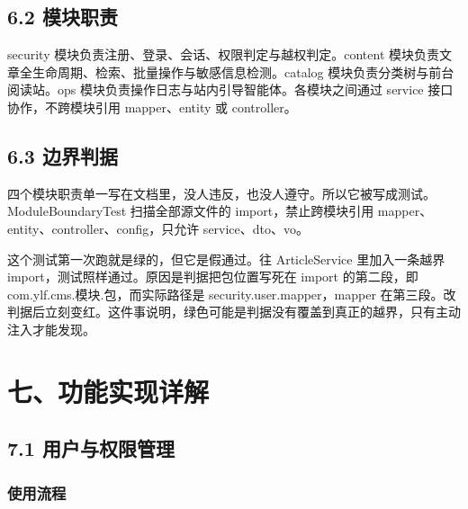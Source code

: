 \documentclass[zihao=-4,UTF8,openany]{ctexart}
\renewcommand{\_}{\textunderscore\allowbreak}
\begin{document}
\subsection*{\texorpdfstring{\textbf{6.2 模块职责}}{6.2 模块职责}}\label{ux6a21ux5757ux804cux8d23}

security 模块负责注册、登录、会话、权限判定与越权判定。content 模块负责文章全生命周期、检索、批量操作与敏感信息检测。catalog 模块负责分类树与前台阅读站。ops 模块负责操作日志与站内引导智能体。各模块之间通过 service 接口协作，不跨模块引用 mapper、entity 或 controller。

\subsection*{\texorpdfstring{\textbf{6.3 边界判据}}{6.3 边界判据}}\label{ux8fb9ux754cux5224ux636e}

四个模块职责单一写在文档里，没人违反，也没人遵守。所以它被写成测试。ModuleBoundaryTest 扫描全部源文件的 import，禁止跨模块引用 mapper、entity、controller、config，只允许 service、dto、vo。

这个测试第一次跑就是绿的，但它是假通过。往 ArticleService 里加入一条越界 import，测试照样通过。原因是判据把包位置写死在 import 的第二段，即 com.ylf.cms.模块.包，而实际路径是 security.user.mapper，mapper 在第三段。改判据后立刻变红。这件事说明，绿色可能是判据没有覆盖到真正的越界，只有主动注入才能发现。

\section*{\texorpdfstring{\textbf{七、功能实现详解}}{七、功能实现详解}}\label{ux4e03ux529fux80fdux5b9eux73b0ux8be6ux89e3}

\subsection*{\texorpdfstring{\textbf{7.1 用户与权限管理}}{7.1 用户与权限管理}}\label{ux7528ux6237ux6743ux9650ux7ba1ux7406}

\subsubsection*{\texorpdfstring{\textbf{使用流程}}{使用流程}}\label{sec:user-flow}
\end{document}
